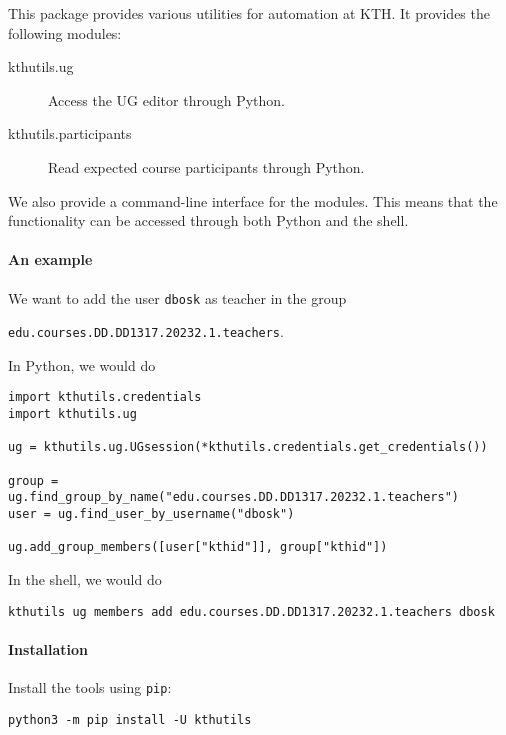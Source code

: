 This package provides various utilities for automation at KTH.
It provides the following modules:
\begin{description}
  \item[kthutils.ug] Access the UG editor through Python.
  \item[kthutils.participants] Read expected course participants through 
    Python.
\end{description}

We also provide a command-line interface for the modules.
This means that the functionality can be accessed through both Python and the 
shell.

\paragraph{An example}

We want to add the user \texttt{dbosk} as teacher in the 
group
\begin{center}
  \texttt{edu.courses.DD.DD1317.20232.1.teachers}.
\end{center}

In Python, we would do
\begin{verbatim}
import kthutils.credentials
import kthutils.ug

ug = kthutils.ug.UGsession(*kthutils.credentials.get_credentials())

group = ug.find_group_by_name("edu.courses.DD.DD1317.20232.1.teachers")
user = ug.find_user_by_username("dbosk")

ug.add_group_members([user["kthid"]], group["kthid"])
\end{verbatim}

In the shell, we would do
\begin{verbatim}
kthutils ug members add edu.courses.DD.DD1317.20232.1.teachers dbosk
\end{verbatim}

\paragraph{Installation}

Install the tools using \texttt{pip}:
\begin{verbatim}
python3 -m pip install -U kthutils
\end{verbatim}
